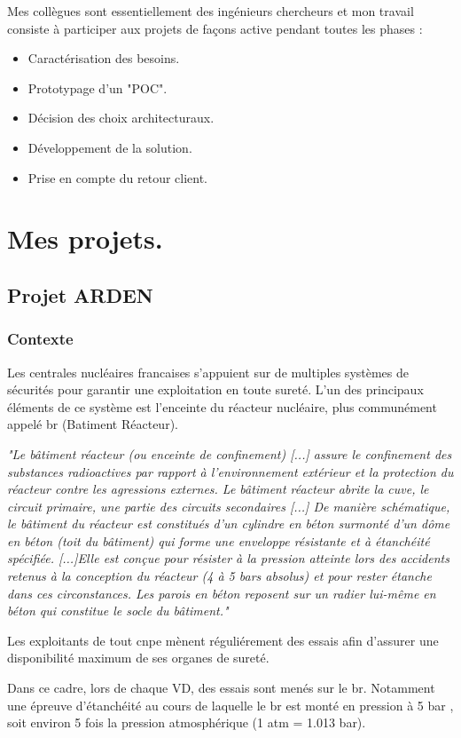 Mes collègues sont essentiellement des ingénieurs chercheurs et mon travail consiste à participer aux projets de façons active pendant toutes les phases : 
\begin{itemize}
\item Caractérisation des besoins.
\item Prototypage d'un "\gls{POC}".
\item Décision des choix architecturaux.
\item Développement de la solution.
\item Prise en compte du retour client.
\end{itemize}

\chapter{Mes projets.}
\section{Projet ARDEN}
\subsection{Contexte}
Les centrales nucléaires francaises s'appuient sur de multiples systèmes de sécurités pour garantir une exploitation en toute sureté. L'un des principaux éléments de ce système est l'enceinte du réacteur nucléaire, plus communément appelé \acrshort{br} (Batiment Réacteur).

\textit{"Le bâtiment réacteur (ou enceinte de confinement) [...] assure le confinement des substances radioactives par rapport à l’environnement extérieur et la protection du réacteur contre les agressions externes. 
Le bâtiment réacteur abrite la cuve, le circuit primaire, une partie des circuits secondaires [...]
De manière schématique, le bâtiment du réacteur est constitués d’un cylindre en béton surmonté d’un dôme en béton (toit du bâtiment) qui forme une enveloppe résistante et à étanchéité spécifiée.
[...]Elle est conçue pour résister à la pression atteinte lors des accidents retenus à la conception du réacteur (4 à 5 bars absolus) et pour rester étanche dans ces circonstances. Les parois en béton reposent sur un radier lui-même en béton qui constitue le socle du bâtiment."} \cite[IRSN]{IRSN_suretee}

Les exploitants de tout \acrshort{cnpe} mènent réguliérement des essais afin d'assurer une disponibilité maximum de ses organes de sureté. 

Dans ce cadre, lors de chaque \gls{VD}, des essais sont menés sur le \acrshort{br}. Notamment une épreuve d'étanchéité au cours de laquelle le \gls{br} est monté en pression à 5 bar , soit environ 5 fois la pression atmosphérique (1 atm = 1.013 bar).

